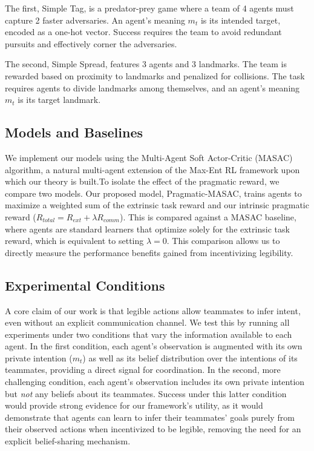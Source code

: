 \documentclass{article}
\begin{document}
The first, Simple Tag, is a predator-prey game where a team of 4 agents must capture 2 faster adversaries. An agent's meaning $m_t$ is its intended target, encoded as a one-hot vector. Success requires the team to avoid redundant pursuits and effectively corner the adversaries.

The second, Simple Spread, features 3 agents and 3 landmarks. The team is rewarded based on proximity to landmarks and penalized for collisions. The task requires agents to divide landmarks among themselves, and an agent's meaning $m_t$ is its target landmark.

\subsection{Models and Baselines}
\label{ssec:models}

We implement our models using the Multi-Agent Soft Actor-Critic (MASAC) algorithm, a natural multi-agent extension of the Max-Ent RL framework upon which our theory is built.To isolate the effect of the pragmatic reward, we compare two models. Our proposed model, Pragmatic-MASAC, trains agents to maximize a weighted sum of the extrinsic task reward and our intrinsic pragmatic reward ($R_{total} = R_{ext} + \lambda R_{comm}$). This is compared against a MASAC baseline, where agents are standard learners that optimize solely for the extrinsic task reward, which is equivalent to setting $\lambda=0$. This comparison allows us to directly measure the performance benefits gained from incentivizing legibility.

\subsection{Experimental Conditions}
\label{ssec:conditions}

A core claim of our work is that legible actions allow teammates to infer intent, even without an explicit communication channel. We test this by running all experiments under two conditions that vary the information available to each agent. In the first condition, each agent's observation is augmented with its own private intention ($m_t$) as well as its belief distribution over the intentions of its teammates, providing a direct signal for coordination. In the second, more challenging condition, each agent's observation includes its own private intention but \textit{not} any beliefs about its teammates. Success under this latter condition would provide strong evidence for our framework's utility, as it would demonstrate that agents can learn to infer their teammates' goals purely from their observed actions when incentivized to be legible, removing the need for an explicit belief-sharing mechanism.
\end{document}
